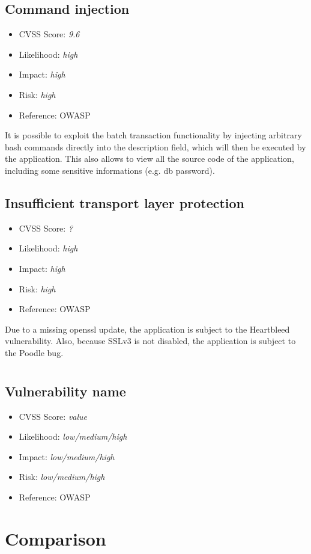 \subsection{Command injection} \label{over:vuln_3}
\begin{itemize}
	\item CVSS Score: \textit{9.6}
	\item Likelihood: \textit{high}
	\item Impact: \textit{high}
	\item Risk: \textit{high}
	\item Reference: OWASP 
\end{itemize}
It is possible to exploit the batch transaction functionality by injecting arbitrary bash commands directly into the description field, which will then be executed by the application.
This also allows to view all the source code of the application, including some sensitive informations (e.g. db password).

\subsection{Insufficient transport layer protection} \label{over:vuln_4}
\begin{itemize}
	\item CVSS Score: \textit{?}
	\item Likelihood: \textit{high}
	\item Impact: \textit{high}
	\item Risk: \textit{high}
	\item Reference: OWASP 
\end{itemize}
Due to a missing openssl update, the application is subject to the Heartbleed vulnerability. Also, because SSLv3 is not disabled, the application is subject to the Poodle bug.

\section{\gnb}
\subsection{Vulnerability name} \label{over:our_test}
\begin{itemize}
	\item CVSS Score: \textit{value}
	\item Likelihood: \textit{low/medium/high}
	\item Impact: \textit{low/medium/high}
	\item Risk: \textit{low/medium/high}
	\item Reference: OWASP 
\end{itemize}
	
\section{Comparison}


